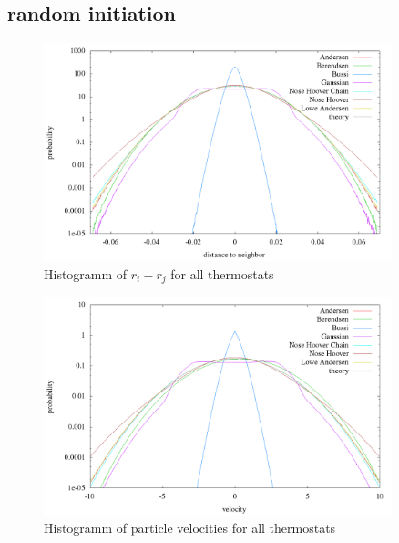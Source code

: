 % 
\graphicspath{{../graphics/}}


\subsection{random initiation}

\begin{figure}[H]
\centering
\includegraphics[width=0.9\textwidth]{./graphics/Histogramm_relPos_rand_T=20_p=64.png}
\caption{Histogramm of $r_i - r_j$ for all thermostats}
\label{im:relPos_rand}
\end{figure} 

\begin{figure}[H]
\centering
\includegraphics[width=0.9\textwidth]{./graphics/Histogramm_velocity_rand_T=20_p=64.png}
\caption{Histogramm of particle velocities for all thermostats}
\label{im:vel_rand}
\end{figure}

